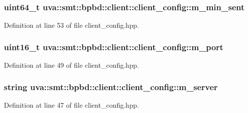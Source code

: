 \subsubsection[{m\+\_\+min\+\_\+sent}]{\setlength{\rightskip}{0pt plus 5cm}uint64\+\_\+t uva\+::smt\+::bpbd\+::client\+::client\+\_\+config\+::m\+\_\+min\+\_\+sent}\label{structuva_1_1smt_1_1bpbd_1_1client_1_1client__config_a91950d080e1bf75c605e4c4d554c2d1d}


Definition at line 53 of file client\+\_\+config.\+hpp.

\hypertarget{structuva_1_1smt_1_1bpbd_1_1client_1_1client__config_aca75c0d31b837ea5ae2ee1225256dd3c}{}
\subsubsection[{m\+\_\+port}]{\setlength{\rightskip}{0pt plus 5cm}uint16\+\_\+t uva\+::smt\+::bpbd\+::client\+::client\+\_\+config\+::m\+\_\+port}\label{structuva_1_1smt_1_1bpbd_1_1client_1_1client__config_aca75c0d31b837ea5ae2ee1225256dd3c}


Definition at line 49 of file client\+\_\+config.\+hpp.

\hypertarget{structuva_1_1smt_1_1bpbd_1_1client_1_1client__config_a1659fbcf6cab9f31d2303a6eace62024}{}
\subsubsection[{m\+\_\+server}]{\setlength{\rightskip}{0pt plus 5cm}string uva\+::smt\+::bpbd\+::client\+::client\+\_\+config\+::m\+\_\+server}\label{structuva_1_1smt_1_1bpbd_1_1client_1_1client__config_a1659fbcf6cab9f31d2303a6eace62024}


Definition at line 47 of file client\+\_\+config.\+hpp.

\hypertarget{structuva_1_1smt_1_1bpbd_1_1client_1_1client__config_af701ff475a04b3aca0e52176608633d1}{}
